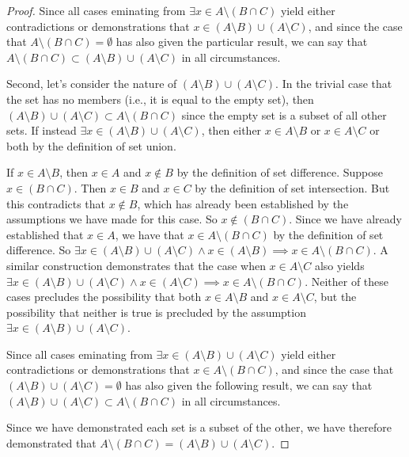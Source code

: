 \documentclass[main.tex]{subfiles}
\begin{document}
\begin{proof}
	Since all cases eminating from \(\exists x \in A \setminus (B \cap C)\)
	yield either contradictions or demonstrations that
	\(x \in (A \setminus B) \cup (A \setminus C)\), and since the case that
	\(A \setminus (B \cap C) = \emptyset\) has also given the particular
	result, we can say that
	\(A \setminus (B \cap C) \subset (A \setminus B) \cup (A \setminus C)\)
	in all circumstances.

	\medskip
	Second, let's consider the nature of
	\((A \setminus B) \cup (A \setminus C)\). In the trivial case that the
	set has no members (i.e., it is equal to the empty set), then
	\((A \setminus B) \cup (A \setminus C) \subset A \setminus (B \cap C)\)
	since the empty set is a subset of all other sets. If instead
	\(\exists x \in (A \setminus B) \cup (A \setminus C)\), then either
	\(x \in A \setminus B\) or \(x \in A \setminus C\) or both by the
	definition of set union.

	If \(x \in A \setminus B\), then \(x \in A\) and \(x \notin B\) by the
	definition of set difference. Suppose \(x \in (B \cap C)\). Then
	\(x \in B\) and \(x \in C\) by the definition of set intersection. But
	this contradicts that \(x \notin B\), which has already been established
	by the assumptions we have made for this case. So
	\(x \notin (B \cap C)\). Since we have already established that
	\(x \in A\), we have that \(x \in A \setminus (B \cap C)\) by the
	definition of set difference. So
	\(\exists x \in (A \setminus B) \cup (A \setminus C) \land x \in (A \setminus B)
	\implies x \in A \setminus (B \cap C)\). A similar construction
	demonstrates that the case when \(x \in A \setminus C\) also yields
	\(\exists x \in (A \setminus B) \cup (A \setminus C) \land x \in (A \setminus C)
	\implies x \in A \setminus (B \cap C)\). Neither of these cases
	precludes the possibility that both \(x \in A \setminus B\) and
	\(x \in A \setminus C\), but the possibility that neither is true is
	precluded by the assumption
	\(\exists x \in (A \setminus B) \cup (A \setminus C)\).

	Since all cases eminating from
	\(\exists x \in (A \setminus B) \cup (A \setminus C)\) yield either
	contradictions or demonstrations that \(x \in A \setminus (B \cap C)\),
	and since the case that
	\((A \setminus B) \cup (A \setminus C) = \emptyset\) has also given the
	following result, we can say that
	\((A \setminus B) \cup (A \setminus C) \subset A \setminus (B \cap C)\)
	in all circumstances.

	\medskip
	Since we have demonstrated each set is a subset of the other, we have
	therefore demonstrated that
	\(A \setminus (B \cap C) = (A \setminus B) \cup (A \setminus C)\).
\end{proof}
\end{document}
